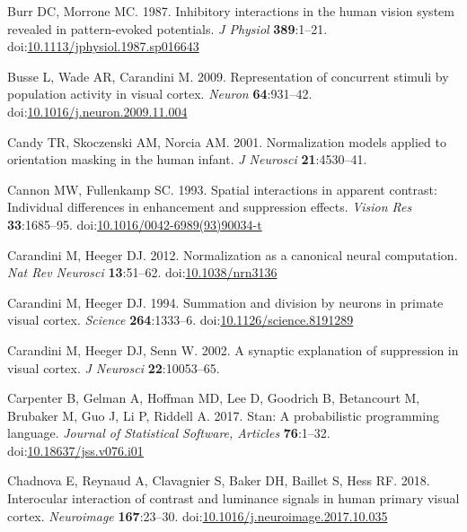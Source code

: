 \documentclass[]{article}
\begin{document}
\leavevmode\hypertarget{ref-Burr1987}{}%
Burr DC, Morrone MC. 1987. Inhibitory interactions in the human vision system revealed in pattern-evoked potentials. \emph{J Physiol} \textbf{389}:1--21. doi:\href{https://doi.org/10.1113/jphysiol.1987.sp016643}{10.1113/jphysiol.1987.sp016643}

\leavevmode\hypertarget{ref-Busse2009}{}%
Busse L, Wade AR, Carandini M. 2009. Representation of concurrent stimuli by population activity in visual cortex. \emph{Neuron} \textbf{64}:931--42. doi:\href{https://doi.org/10.1016/j.neuron.2009.11.004}{10.1016/j.neuron.2009.11.004}

\leavevmode\hypertarget{ref-Candy2001}{}%
Candy TR, Skoczenski AM, Norcia AM. 2001. Normalization models applied to orientation masking in the human infant. \emph{J Neurosci} \textbf{21}:4530--41.

\leavevmode\hypertarget{ref-Cannon1993}{}%
Cannon MW, Fullenkamp SC. 1993. Spatial interactions in apparent contrast: Individual differences in enhancement and suppression effects. \emph{Vision Res} \textbf{33}:1685--95. doi:\href{https://doi.org/10.1016/0042-6989(93)90034-t}{10.1016/0042-6989(93)90034-t}

\leavevmode\hypertarget{ref-Carandini2012}{}%
Carandini M, Heeger DJ. 2012. Normalization as a canonical neural computation. \emph{Nat Rev Neurosci} \textbf{13}:51--62. doi:\href{https://doi.org/10.1038/nrn3136}{10.1038/nrn3136}

\leavevmode\hypertarget{ref-Carandini1994}{}%
Carandini M, Heeger DJ. 1994. Summation and division by neurons in primate visual cortex. \emph{Science} \textbf{264}:1333--6. doi:\href{https://doi.org/10.1126/science.8191289}{10.1126/science.8191289}

\leavevmode\hypertarget{ref-Carandini2002}{}%
Carandini M, Heeger DJ, Senn W. 2002. A synaptic explanation of suppression in visual cortex. \emph{J Neurosci} \textbf{22}:10053--65.

\leavevmode\hypertarget{ref-Carpenter2017}{}%
Carpenter B, Gelman A, Hoffman MD, Lee D, Goodrich B, Betancourt M, Brubaker M, Guo J, Li P, Riddell A. 2017. Stan: A probabilistic programming language. \emph{Journal of Statistical Software, Articles} \textbf{76}:1--32. doi:\href{https://doi.org/10.18637/jss.v076.i01}{10.18637/jss.v076.i01}

\leavevmode\hypertarget{ref-Chadnova2018}{}%
Chadnova E, Reynaud A, Clavagnier S, Baker DH, Baillet S, Hess RF. 2018. Interocular interaction of contrast and luminance signals in human primary visual cortex. \emph{Neuroimage} \textbf{167}:23--30. doi:\href{https://doi.org/10.1016/j.neuroimage.2017.10.035}{10.1016/j.neuroimage.2017.10.035}
\end{document}
